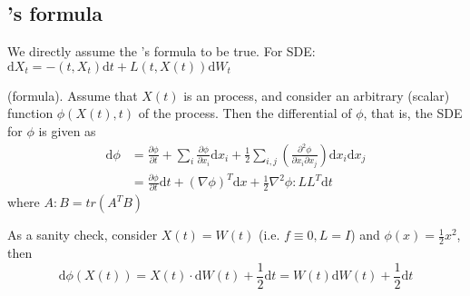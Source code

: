 \subsection{\ito's formula}
We directly assume the \ito's formula to be true.
For SDE: $\mathrm{d}X_t = -(t,X_t)\mathrm{d}t + L(t,X(t))\mathrm{d}W_t$



\begin{theorem}
(\ito formula). Assume that $X(t)$ is an \ito process, and consider an arbitrary (scalar) function $\phi(X(t),t)$ of the process. Then the \ito differential of $\phi $, that is, the \ito SDE for $\phi$ is given as
\begin{equation*}
    \begin{aligned}
        \mathrm{d}\phi &= \frac{\partial \phi}{\partial t}+\sum_{i}\frac{\partial\phi}{\partial x_i}\mathrm{d}x_i+\frac{1}{2}\sum_{i,j}(\frac{\partial^2\phi}{\partial x_i\partial x_j})\mathrm{d}x_i \mathrm{d}x_j\\
        &=\frac{\partial\phi}{\partial t}\mathrm{d}t+(\nabla\phi)^T\mathrm{d}x+\frac{1}{2}\nabla^2\phi:LL^T\mathrm{d}t
    \end{aligned}
\end{equation*}
where $A:B = tr(A^TB)$
\end{theorem}
As a sanity check, consider $X(t) = W(t)$ (i.e. $f\equiv 0,L=I$) and $\phi(x) = \frac{1}{2}x^2$, then
$$
\mathrm{d} \phi(X(t)) = X(t)\cdot \mathrm{d}W(t)+\frac{1}{2}\mathrm{d}t = W(t)\mathrm{d}W(t)+\frac{1}{2}\mathrm{d}t
$$
